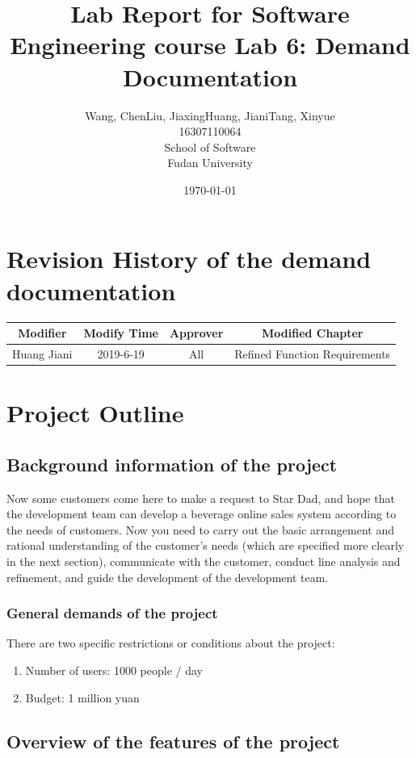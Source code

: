 \documentclass[a4paper]{report}
\title{Lab Report for Software Engineering course \newline
 Lab 6: Demand Documentation}
\author{Wang, Chen\qquad Liu, Jiaxing\qquad Huang, Jiani\qquad Tang, Xinyue \\
16307110064\qquad17302010049\qquad 17302010063\qquad 16307110476 \\
School of Software\\
Fudan University
}
\date{\today}
\begin{document}
\maketitle

\tableofcontents
\chapter{Revision History of the demand documentation}

\begin{tabular}{|c|c|c|c|} 
\hline 
Modifier&Modify Time&Approver&Modified Chapter\\
\hline  
Huang Jiani&2019-6-19&All&Refined Function Requirements\\
\hline 
\end{tabular}

\chapter{Project Outline}
\section{Background information of the project}
Now some customers come here to make a request to Star Dad, and hope that the development team can develop a beverage online sales system according to the needs of customers. Now you need to carry out the basic arrangement and rational understanding of the customer's needs (which are specified more clearly in the next section), communicate with the customer, conduct line analysis and refinement, and guide the development of the development team.
\par
\subsection{General demands of the project}
There are two specific restrictions or conditions about the project:
\begin{enumerate}
\item
Number of users: 1000 people / day
\item
Budget: 1 million yuan

\end{enumerate}

\section{Overview of the features of the project}
\end{document}
